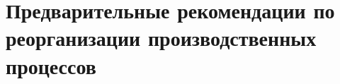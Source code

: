 






















\section{Предварительные рекомендации по реорганизации производственных процессов}




